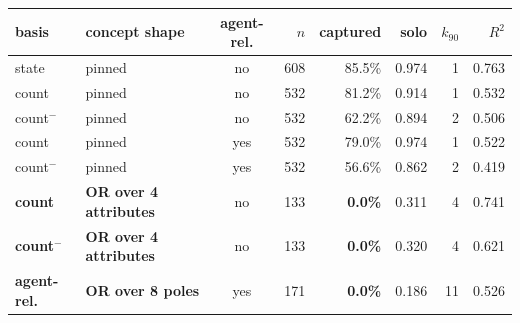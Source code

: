 \begin{tabular}{llcrrrrr}
\toprule
basis & concept shape & agent-rel. & $n$ & captured & solo & $k_{90}$ & $R^2$ \\
\midrule
state & pinned & no & 608 & 85.5\% & 0.974 & 1 & 0.763 \\
count & pinned & no & 532 & 81.2\% & 0.914 & 1 & 0.532 \\
count$^{-}$ & pinned & no & 532 & 62.2\% & 0.894 & 2 & 0.506 \\
count & pinned & yes & 532 & 79.0\% & 0.974 & 1 & 0.522 \\
count$^{-}$ & pinned & yes & 532 & 56.6\% & 0.862 & 2 & 0.419 \\
\midrule
\textbf{count} & \textbf{OR over 4 attributes} & no & 133 & \textbf{0.0\%} & 0.311 & 4 & 0.741 \\
\textbf{count$^{-}$} & \textbf{OR over 4 attributes} & no & 133 & \textbf{0.0\%} & 0.320 & 4 & 0.621 \\
\midrule
\textbf{agent-rel.} & \textbf{OR over 8 poles} & yes & 171 & \textbf{0.0\%} & 0.186 & 11 & 0.526 \\
\bottomrule
\end{tabular}
